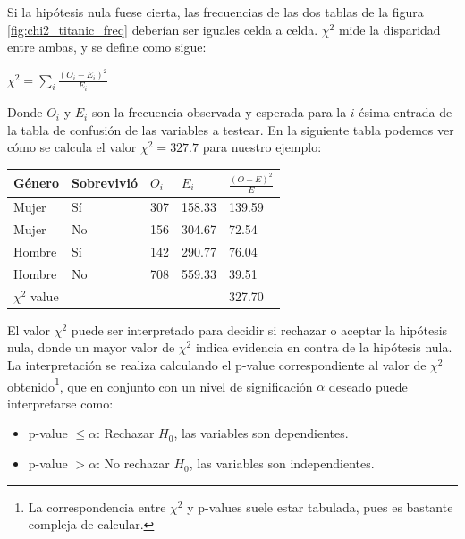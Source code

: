 Si la hipótesis nula fuese cierta, las frecuencias de las dos tablas de la figura \ref{fig:chi2_titanic_freq} deberían ser iguales celda a celda. $\chi^2$ mide la disparidad entre ambas, y se define como sigue:

\begin{center}
$\chi^2 = \sum_i \frac{(O_i - E_i)^2}{E_i}$
\end{center}

Donde $O_i$ y $E_i$ son la frecuencia observada y esperada para la $i$-ésima entrada de la tabla de confusión de las variables a testear. En la siguiente tabla podemos ver cómo se calcula el valor $\chi^2 = 327.7$ para nuestro ejemplo:

\begin{table}[h!]
\center
\begin{tabular}{|l|l|l|l|l|}
\hline
\textbf{Género}  & \textbf{Sobrevivió}    & $O_i$   & $E_i$    &  $\frac{ (O-E)^2 }{E}$ \\ \hline
Mujer   & Sí    & 307     & 158.33   &  139.59                \\ \hline
Mujer   & No  & 156     & 304.67   &  72.54                 \\ \hline
Hombre  & Sí    & 142     & 290.77   &  76.04                 \\ \hline
Hombre  & No  & 708     & 559.33   &  39.51                 \\ \hline
$\chi^2$ value &   &    &         &           327.70                \\ \hline
\end{tabular}
\end{table}

El valor $\chi^2$ puede ser interpretado para decidir si rechazar o aceptar la hipótesis nula, donde un mayor valor de $\chi^2$ indica evidencia en contra de la hipótesis nula. La interpretación se realiza calculando el p-value correspondiente al valor de $\chi^2$ obtenido\footnote{La correspondencia entre $\chi^2$ y p-values suele estar tabulada, pues es bastante compleja de calcular.}, que en conjunto con un nivel de significación $\alpha$ deseado puede interpretarse como: 

\begin{itemize}
\item p-value $\leq \alpha$: Rechazar $H_0$, las variables son dependientes.
\item p-value $> \alpha$: No rechazar $H_0$,  las variables son independientes.
\end{itemize}

